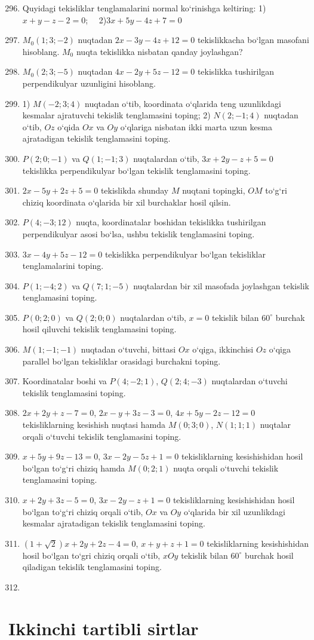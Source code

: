 \begin{enumerate}\setcounter{enumi}{295}
	\item Quyidagi tekisliklar tenglamalarini normal ko`rinishga keltiring:
	1)$x+y-z-2=0$; \ \ 2)$3x+5y-4z+7=0$
	\item $M_0(1;3;-2)$ nuqtadan $2x-3y-4z+12=0$ tekislikkacha bo`lgan masofani hisoblang. $M_0$ nuqta tekislikka nisbatan qanday joylashgan?
	\item $M_0(2;3;-5)$ nuqtadan $4x-2y+5z-12=0$ tekislikka tushirilgan perpendikulyar uzunligini hisoblang.
	\item 1) $M(-2;3;4)$ nuqtadan o`tib, koordinata o`qlarida teng uzunlikdagi kesmalar ajratuvchi tekislik tenglamasini toping;
	2) $N(2;-1;4)$ nuqtadan o`tib, $Oz$ o`qida $Ox$ va $Oy$ o`qlariga nisbatan ikki marta uzun kesma ajratadigan tekislik tenglamasini toping.
	\item $P(2;0;-1)$ va $Q(1;-1;3)$ nuqtalardan o`tib, $3x+2y-z+5=0$ tekislikka perpendikulyar bo`lgan tekislik tenglamasini toping. 
	\item $2x-5y+2z+5=0$ tekislikda shunday $M$ nuqtani topingki, $OM$ to`g`ri chiziq koordinata o`qlarida bir xil burchaklar hosil qilsin.
	\item $P(4;-3;12)$ nuqta, koordinatalar boshidan tekislikka tushirilgan perpendikulyar asosi bo`lsa, ushbu tekislik tenglamasini toping.
	\item $3x-4y+5z-12=0$ tekislikka perpendikulyar bo`lgan tekisliklar tenglamalarini toping.
	\item $P(1;-4;2)$ va $Q(7;1;-5)$ nuqtalardan bir xil masofada joylashgan tekislik tenglamasini toping.
	\item $P(0;2;0)$ va $Q(2;0;0)$ nuqtalardan o`tib, $x=0$ tekislik bilan $60^\circ$ burchak hosil qiluvchi tekislik tenglamasini toping.
	\item $M(1;-1;-1)$ nuqtadan o`tuvchi, bittasi $Ox$ o`qiga, ikkinchisi $Oz$ o`qiga parallel bo`lgan tekisliklar orasidagi burchakni toping.
	\item Koordinatalar boshi va $P(4;-2;1)$, $Q(2;4;-3)$ nuqtalardan o`tuvchi tekislik tenglamasini toping.
	\item $2x+2y+z-7=0$, $2x-y+3z-3=0$, $4x+5y-2z-12=0$ tekisliklarning kesishish nuqtasi hamda $M(0;3;0)$, $N(1;1;1)$ nuqtalar orqali o`tuvchi tekislik tenglamasini toping.
	\item $x+5y+9z-13=0$, $3x-2y-5z+1=0$ tekisliklarning kesishishidan hosil bo`lgan to`g`ri chiziq hamda $M(0;2;1)$ nuqta orqali o`tuvchi tekislik tenglamasini toping.
	\item $x+2y+3z-5=0$, $3x-2y-z+1=0$ tekisliklarning kesishishidan hosil bo`lgan to`g`ri chiziq orqali o`tib, $Ox$ va $Oy$ o`qlarida bir xil uzunlikdagi kesmalar ajratadigan tekislik tenglamasini toping.
	\item $(1+\sqrt{2})x+2y+2z-4=0$, $x+y+z+1=0$ tekisliklarning kesishishidan hosil bo`lgan to`gri chiziq orqali o`tib, $xOy$ tekislik bilan $60^\circ$ burchak hosil qiladigan tekislik tenglamasini toping.
	\item 

	
	
\end{enumerate}
\section{Ikkinchi tartibli sirtlar}
